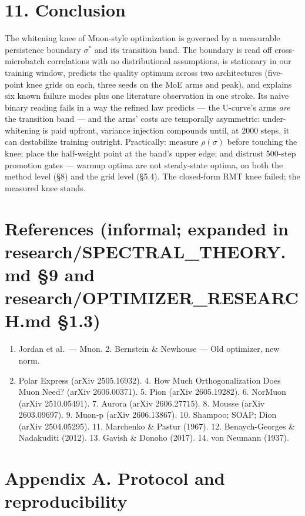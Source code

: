 \documentclass[
]{article}
\providecommand{\tightlist}{%
  \setlength{\itemsep}{0pt}\setlength{\parskip}{0pt}}
\begin{document}
\section{11. Conclusion}\label{conclusion}

The whitening knee of Muon-style optimization is governed by a
measurable persistence boundary \(\sigma^*\) and its transition band.
The boundary is read off cross-microbatch correlations with no
distributional assumptions, is stationary in our training window,
predicts the quality optimum across two architectures (five-point knee
grids on each, three seeds on the MoE arms and peak), and explains six
known failure modes plus one literature observation in one stroke. Its
naive binary reading fails in a way the refined law predicts --- the
U-curve's arms \emph{are} the transition band --- and the arms' costs
are temporally asymmetric: under-whitening is paid upfront, variance
injection compounds until, at 2000 steps, it can destabilize training
outright. Practically: measure \(\rho(\sigma)\) before touching the
knee; place the half-weight point at the band's upper edge; and distrust
500-step promotion gates --- warmup optima are not steady-state optima,
on both the method level (§8) and the grid level (§5.4). The closed-form
RMT knee failed; the measured knee stands.

\section{References (informal; expanded in research/SPECTRAL\_THEORY.md
§9 and research/OPTIMIZER\_RESEARCH.md
§1.3)}\label{references-informal-expanded-in-researchspectral_theory.md-9-and-researchoptimizer_research.md-1.3}

\begin{enumerate}
\def\labelenumi{\arabic{enumi}.}
\tightlist
\item
  Jordan et al.~--- Muon. 2. Bernstein \& Newhouse --- Old optimizer,
  new norm.
\item
  Polar Express (arXiv 2505.16932). 4. How Much Orthogonalization Does
  Muon Need? (arXiv 2606.00371). 5. Pion (arXiv 2605.19282). 6. NorMuon
  (arXiv 2510.05491). 7. Aurora (arXiv 2606.27715). 8. Mousse (arXiv
  2603.09697). 9. Muon-p (arXiv 2606.13867). 10. Shampoo; SOAP; Dion
  (arXiv 2504.05295). 11. Marchenko \& Pastur (1967). 12.
  Benaych-Georges \& Nadakuditi (2012). 13. Gavish \& Donoho (2017). 14.
  von Neumann (1937).
\end{enumerate}

\section{Appendix A. Protocol and
reproducibility}\label{appendix-a.-protocol-and-reproducibility}
\end{document}
